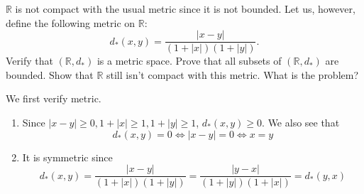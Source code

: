   \begin{exercise}
    $\mathbb{R}$ is not compact with the usual metric since it is not bounded. Let us,
    however, define the following metric on $\mathbb{R}$:
    \begin{equation}
      d_{\ast}(x,y) = \frac{|x-y|}{(1+|x|)(1+|y|)}.
    \end{equation}
    Verify that $(\mathbb{R},d_{\ast})$ is a metric space. Prove that all subsets of $(\mathbb{R},d_{\ast})$ are
    bounded. Show that $\mathbb{R}$ still isn't compact with this metric. What is the
    problem?
  \end{exercise}
  \begin{solution}
    We first verify metric. 
    \begin{enumerate}
      \item Since $|x - y| \geq 0, 1 + |x| \geq 1, 1 + |y| \geq 1$, $d_\ast (x, y) \geq 0$. We also see that 
      \begin{equation}
        d_\ast (x, y) = 0 \iff |x - y| = 0 \iff x = y
      \end{equation}

      \item It is symmetric since 
      \begin{equation}
        d_\ast (x, y) = \frac{|x - y|}{(1 + |x|)(1 + |y|)} = \frac{|y - x|}{(1 + |y|)(1 + |x|)} = d_\ast (y, x)
      \end{equation}


\end{enumerate}
\end{solution}
